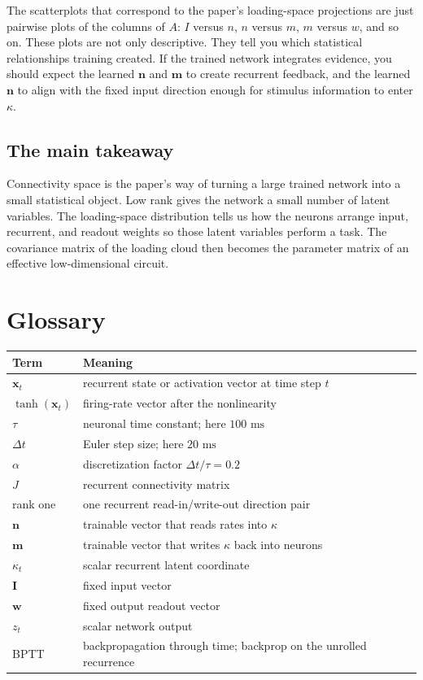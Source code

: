 \documentclass[11pt]{article}
\newcommand{\vx}{\mathbf{x}}
\newcommand{\vm}{\mathbf{m}}
\newcommand{\vn}{\mathbf{n}}
\newcommand{\vI}{\mathbf{I}}
\newcommand{\vw}{\mathbf{w}}
\newcommand{\dt}{\Delta t}
\begin{document}
The scatterplots that correspond to the paper's loading-space projections are
just pairwise plots of the columns of $A$: $I$ versus $n$, $n$ versus $m$, $m$
versus $w$, and so on. These plots are not only descriptive. They tell you which
statistical relationships training created. If the trained network integrates
evidence, you should expect the learned $\vn$ and $\vm$ to create recurrent
feedback, and the learned $\vn$ to align with the fixed input direction enough
for stimulus information to enter $\kappa$.

\subsection{The main takeaway}

Connectivity space is the paper's way of turning a large trained network into a
small statistical object. Low rank gives the network a small number of latent
variables. The loading-space distribution tells us how the neurons arrange
input, recurrent, and readout weights so those latent variables perform a task.
The covariance matrix of the loading cloud then becomes the parameter matrix of
an effective low-dimensional circuit.

\section*{Glossary}

\begin{tabular}{@{}ll@{}}
\toprule
Term & Meaning \\
\midrule
$\vx_t$ & recurrent state or activation vector at time step $t$ \\
$\tanh(\vx_t)$ & firing-rate vector after the nonlinearity \\
$\tau$ & neuronal time constant; here $100\text{ ms}$ \\
$\dt$ & Euler step size; here $20\text{ ms}$ \\
$\alpha$ & discretization factor $\dt/\tau = 0.2$ \\
$J$ & recurrent connectivity matrix \\
rank one & one recurrent read-in/write-out direction pair \\
$\vn$ & trainable vector that reads rates into $\kappa$ \\
$\vm$ & trainable vector that writes $\kappa$ back into neurons \\
$\kappa_t$ & scalar recurrent latent coordinate \\
$\vI$ & fixed input vector \\
$\vw$ & fixed output readout vector \\
$z_t$ & scalar network output \\
BPTT & backpropagation through time; backprop on the unrolled recurrence \\
\bottomrule
\end{tabular}
\end{document}
